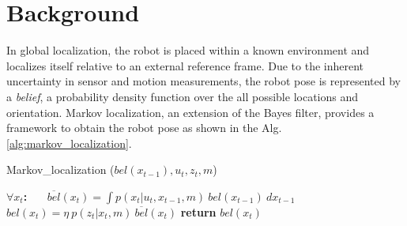 \documentclass[10pt,journal,compsoc]{IEEEtran}
\begin{document}

%
%
%


\section{Background}

In global localization, the robot is placed within a known environment and localizes itself relative to an external reference frame. Due to the inherent uncertainty in sensor and motion measurements, the robot pose is represented by a \textit{belief}, a probability density function over the all possible locations and orientation.  Markov localization, an extension of the Bayes filter, provides a framework to obtain the robot pose as shown in the  Alg. \ref{alg:markov_localization}. 

\begin{algorithm}
\caption{Markov\_localization ($bel(x_{t-1}), u_t, z_t, m$)}\label{euclid}
\label{alg:markov_localization}
\begin{algorithmic}
\STATE  $\forall x_t$\textbf{:}
\STATE ~~~$\overline{bel}(x_t) = \int p(x_t | u_t, x_{t-1}, m)~bel(x_{t-1})~ dx_{t-1}$
\STATE ~~~$bel(x_t) = \eta~p(z_t | x_t, m)~\overline{bel}(x_t)$
\STATE \textbf{return} $bel(x_t)$
\end{algorithmic}
\end{algorithm}
\end{document}
